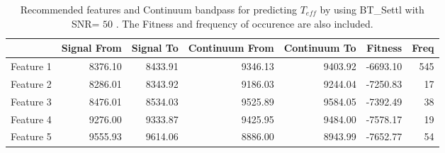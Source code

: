 \begin{table}
\begin{center}
\begin{tabular}{rrrrrrr}
  \hline
 & Signal From & Signal To & Continuum From & Continuum To & Fitness & Freq \\ 
  \hline
Feature 1 & 8376.10 & 8433.91 & 9346.13 & 9403.92 & -6693.10 & 545 \\ 
  Feature 2 & 8286.01 & 8343.92 & 9186.03 & 9244.04 & -7250.83 &  17 \\ 
  Feature 3 & 8476.01 & 8534.03 & 9525.89 & 9584.05 & -7392.49 &  38 \\ 
  Feature 4 & 9276.00 & 9333.87 & 9425.95 & 9484.00 & -7578.17 &  19 \\ 
  Feature 5 & 9555.93 & 9614.06 & 8886.00 & 8943.99 & -7652.77 &  54 \\ 
   \hline
\end{tabular}
\caption {Recommended features and Continuum bandpass for predicting $ T_{eff} $ 
      by using BT\_Settl with SNR= $ 50 $ . 
      The Fitness and frequency of occurence are also included.} \label{tab:tab_SNR50_T} 
\end{center}
\end{table}


